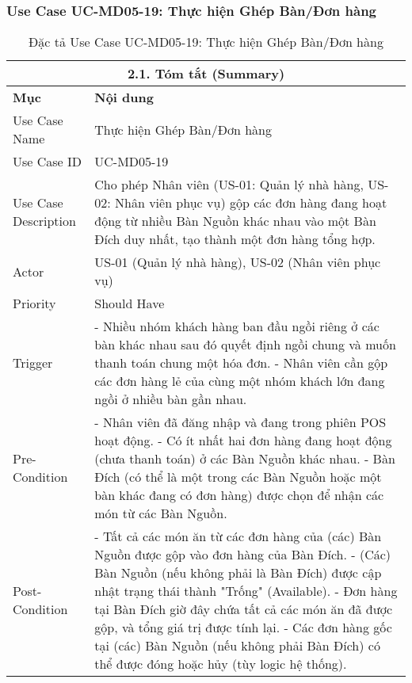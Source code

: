 \subsubsection{Use Case UC-MD05-19: Thực hiện Ghép Bàn/Đơn hàng}
\begin{longtable}{|m{4cm}|p{11cm}|}
\caption{Đặc tả Use Case UC-MD05-19: Thực hiện Ghép Bàn/Đơn hàng} \label{tab:uc_md05_19_final} \\
\hline
\multicolumn{2}{|c|}{\textbf{2.1. Tóm tắt (Summary)}} \\
\hline
\textbf{Mục} & \textbf{Nội dung} \\
\hline
\endhead %
\hline
\endfoot %
\hline
\endlastfoot %
Use Case Name & Thực hiện Ghép Bàn/Đơn hàng \\
\hline
Use Case ID & UC-MD05-19 \\
\hline
Use Case Description & Cho phép Nhân viên (US-01: Quản lý nhà hàng, US-02: Nhân viên phục vụ) gộp các đơn hàng đang hoạt động từ nhiều Bàn Nguồn khác nhau vào một Bàn Đích duy nhất, tạo thành một đơn hàng tổng hợp. \\
\hline
Actor & US-01 (Quản lý nhà hàng), US-02 (Nhân viên phục vụ) \\
\hline
Priority & Should Have \\
\hline
Trigger & - Nhiều nhóm khách hàng ban đầu ngồi riêng ở các bàn khác nhau sau đó quyết định ngồi chung và muốn thanh toán chung một hóa đơn. \newline - Nhân viên cần gộp các đơn hàng lẻ của cùng một nhóm khách lớn đang ngồi ở nhiều bàn gần nhau. \\
\hline
Pre-Condition & - Nhân viên đã đăng nhập và đang trong phiên POS hoạt động. \newline - Có ít nhất hai đơn hàng đang hoạt động (chưa thanh toán) ở các Bàn Nguồn khác nhau. \newline - Bàn Đích (có thể là một trong các Bàn Nguồn hoặc một bàn khác đang có đơn hàng) được chọn để nhận các món từ các Bàn Nguồn. \\
\hline
Post-Condition & - Tất cả các món ăn từ các đơn hàng của (các) Bàn Nguồn được gộp vào đơn hàng của Bàn Đích. \newline - (Các) Bàn Nguồn (nếu không phải là Bàn Đích) được cập nhật trạng thái thành "Trống" (Available). \newline - Đơn hàng tại Bàn Đích giờ đây chứa tất cả các món ăn đã được gộp, và tổng giá trị được tính lại. \newline - Các đơn hàng gốc tại (các) Bàn Nguồn (nếu không phải Bàn Đích) có thể được đóng hoặc hủy (tùy logic hệ thống). \\

\end{longtable}
